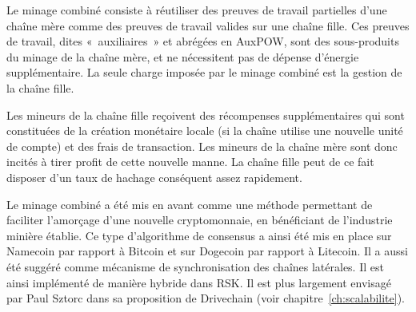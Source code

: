 %
%
%

Le minage combiné consiste à réutiliser des preuves de travail partielles d'une chaîne mère comme des preuves de travail valides sur une chaîne fille. Ces preuves de travail, dites «~auxiliaires~» et abrégées en AuxPOW, sont des sous-produits du minage de la chaîne mère, et ne nécessitent pas de dépense d'énergie supplémentaire. La seule charge imposée par le minage combiné est la gestion de la chaîne fille.

Les mineurs de la chaîne fille reçoivent des récompenses supplémentaires qui sont constituées de la création monétaire locale (si la chaîne utilise une nouvelle unité de compte) et des frais de transaction. Les mineurs de la chaîne mère sont donc incités à tirer profit de cette nouvelle manne. La chaîne fille peut de ce fait disposer d'un taux de hachage conséquent assez rapidement.

Le minage combiné a été mis en avant comme une méthode permettant de faciliter l'amorçage d'une nouvelle cryptomonnaie, en bénéficiant de l'industrie minière établie. Ce type d'algorithme de consensus a ainsi été mis en place sur Namecoin par rapport à Bitcoin et sur Dogecoin par rapport à Litecoin. Il a aussi été suggéré comme mécanisme de synchronisation des chaînes latérales. Il est ainsi implémenté de manière hybride dans RSK. Il est plus largement envisagé par Paul Sztorc dans sa proposition de Drivechain (voir chapitre~\ref{ch:scalabilite}).

